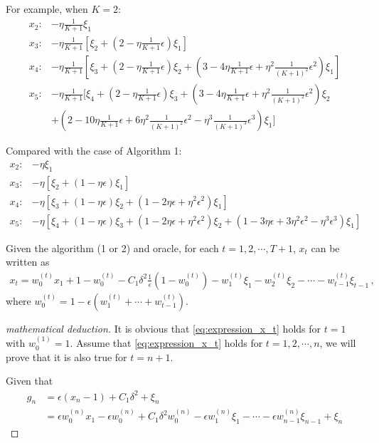 \documentclass[11pt,letterpaper,english]{article}
\begin{document}
For example, when $K=2$:
\begin{align*}
x_2: &-\eta \frac{1}{K+1} \xi_1 \\
x_3: &-\eta \frac{1}{K+1} \left[ \xi_2 + \left( 2- \eta \frac{1}{K+1}\epsilon\right)\xi_1\right]\\
x_4: &-\eta \frac{1}{K+1} \left[ \xi_3 + \left( 2- \eta \frac{1}{K+1}\epsilon\right)\xi_2+ \left( 3- 4\eta \frac{1}{K+1}\epsilon+\eta^2 \frac{1}{(K+1)^2}\epsilon^2\right)\xi_1\right]\\
x_5: &-\eta \frac{1}{K+1} [ \xi_4 + \left( 2- \eta \frac{1}{K+1}\epsilon\right)\xi_3+\left( 3- 4\eta \frac{1}{K+1}\epsilon+\eta^2 \frac{1}{(K+1)^2}\epsilon^2\right)\xi_2  \\
&+ \left( 2- 10\eta \frac{1}{K+1}\epsilon+6\eta^2 \frac{1}{(K+1)^2}\epsilon^2-\eta^3 \frac{1}{(K+1)^3}\epsilon^3\right)\xi_1]
\end{align*}

Compared with the case of Algorithm 1:
\begin{align*}
x_2: &-\eta  \xi_1 \\
x_3: &-\eta  \left[ \xi_2 + \left( 1- \eta \epsilon\right)\xi_1\right]\\
x_4: &-\eta  \left[ \xi_3 + \left( 1- \eta \epsilon\right)\xi_2+ \left( 1- 2\eta \epsilon+\eta^2 \epsilon^2\right)\xi_1\right]\\
x_5: &-\eta  \left[ \xi_4 + \left( 1- \eta \epsilon\right)\xi_3+ \left( 1- 2\eta \epsilon+\eta^2 \epsilon^2\right)\xi_2+ \left( 1- 3\eta \epsilon+3\eta^2 \epsilon^2-\eta^3 \epsilon^3\right)\xi_1\right]
\end{align*}

\begin{proposition}
Given the algorithm (1 or 2) and oracle, for each $t=1,2,\cdots,T+1$, $x_t$ can be written as
\begin{align}
\label{eq:expression_x_t}
x_{t} = w^{(t)}_0 x_1 + 1-w^{(t)}_0 -C_1 \delta^2 \frac{1}{\epsilon}(1-w^{(t)}_0) -w^{(t)}_1 \xi_1 - w^{(t)}_2 \xi_2 - \cdots - w^{(t)}_{t-1} \xi_{t-1} \,,
\end{align}
where $w^{(t)}_0 = 1-\epsilon (w^{(t)}_1+\cdots+w^{(t)}_{t-1})$.
\end{proposition}
\begin{proof}[mathematical deduction]
It is obvious that \ref{eq:expression_x_t} holds for $t=1$ with $w^{(1)}_0=1$.
Assume that \ref{eq:expression_x_t} holds for $t=1,2,\cdots,n$, we will prove that it is also true for $t=n+1$.

Given that 
\begin{align*}
g_n &= \epsilon (x_n-1) + C_1 \delta^2 + \xi_n \\
&= \epsilon w^{(n)}_0 x_1 - \epsilon w^{(n)}_0 + C_1 \delta^2w^{(n)}_0 -\epsilon w^{(n)}_1 \xi_1-\cdots-\epsilon w^{(n)}_{n-1} \xi_{n-1}+\xi_n
\end{align*}

\end{proof}
\end{document}
